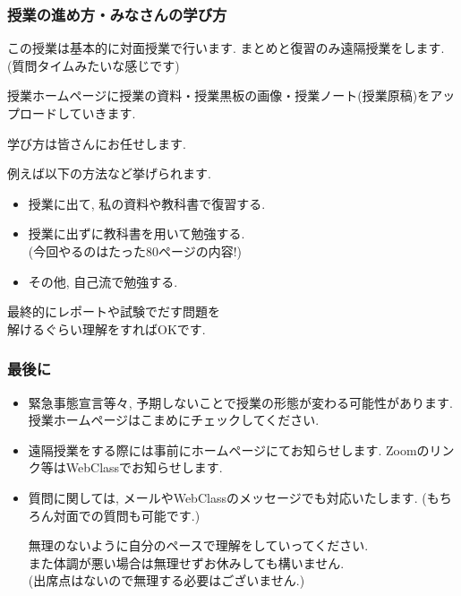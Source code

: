 \documentclass[11pt,dvipdfmx]{beamer}
\theoremstyle{definition}
\theoremstyle{remark}
\begin{document}
\begin{frame}
\frametitle{授業の進め方・みなさんの学び方}
この授業は基本的に対面授業で行います. 
まとめと復習のみ遠隔授業をします.(質問タイムみたいな感じです)

 授業ホームページに授業の資料・授業黒板の画像・授業ノート(授業原稿)をアップロードしていきます.

 \begin{alertblock}{}
  \begin{center}
学び方は皆さんにお任せします.
  \end{center}
 
 \end{alertblock}
 例えば以下の方法など挙げられます.
  \begin{itemize}
  \item 授業に出て, 私の資料や教科書で復習する.
  \item 授業に出ずに教科書を用いて勉強する. \\ (今回やるのはたった80ページの内容!)
  \item その他, 自己流で勉強する.
  \end{itemize}

  \begin{alertblock}{}
  \begin{center}
最終的にレポートや試験でだす問題を \\ 解けるぐらい理解をすればOKです.
  \end{center}
 \end{alertblock}


\end{frame}

\begin{frame}
\frametitle{最後に}
 \begin{itemize}

 \item 緊急事態宣言等々, 予期しないことで授業の形態が変わる可能性があります.
 授業ホームページはこまめにチェックしてください.
 
 
 \item  遠隔授業をする際には事前にホームページにてお知らせします.
Zoomのリンク等はWebClassでお知らせします.
 
\item 質問に関しては, メールやWebClassのメッセージでも対応いたします.
(もちろん対面での質問も可能です.)

  \begin{alertblock}{}
  \begin{center}
無理のないように自分のペースで理解をしていってください. \\
また体調が悪い場合は無理せずお休みしても構いません. \\
(出席点はないので無理する必要はございません.)
  \end{center}
 \end{alertblock}


 \end{itemize}

\end{frame}
\end{document}
